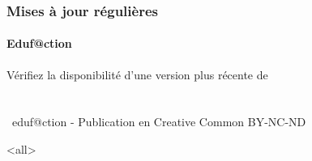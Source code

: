 \begin{frame}
\begin{columns}
\begin{column}{0.1\textwidth}
\begin{figure}
				  \end{figure}
		\end{column}
		\begin{column}{0.9\textwidth}
							
		\end{column}
\end{columns}
 \end{frame}
 
\begin{frame}
\frametitle{Mises à jour régulières}
\framesubtitle{Eduf@ction~\umaila}
{\begin{center} 
 {Vérifiez la disponibilité d'une version plus récente de} \\
 { }   \\ 
{{\huge\ccbyncndeu}}  \\  
{\the\year~eduf@ction - Publication en Creative Common BY-NC-ND }    \\  %
{\safeqrcode[padding]{\GITfilename}}  
\end{center} }
\end{frame}


  \mode<all>{\immediate\closeout\audioexport}







